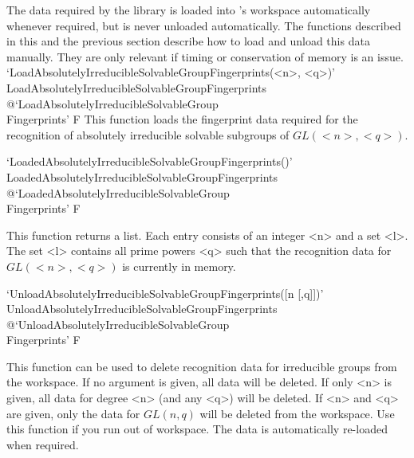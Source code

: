 
The data required by the {\IRREDSOL} library is loaded into {\GAP}'s workspace automatically whenever required, but is never unloaded automatically. The functions described in this
and the previous section describe how to load and unload this data manually. 
They are only relevant if timing or conservation of memory is an issue.
\>`LoadAbsolutelyIrreducibleSolvableGroupFingerprints(<n>, <q>)'%
{LoadAbsolutelyIrreducibleSolvableGroupFingerprints}%
@{`LoadAbsolutelyIrreducibleSolvableGroup\\Fingerprints'} F
This function loads the fingerprint data required for the recognition
of absolutely irreducible solvable subgroups of $GL(<n>, <q>)$.

\>`LoadedAbsolutelyIrreducibleSolvableGroupFingerprints()'%
{LoadedAbsolutelyIrreducibleSolvableGroupFingerprints}%
@{`LoadedAbsolutelyIrreducibleSolvableGroup\\Fingerprints'} F

This function returns a list. Each entry consists of an integer <n> and a set <l>. The set
<l> contains all prime powers <q> such that the recognition data for $GL(<n>, <q>)$ is currently in
memory.

\>`UnloadAbsolutelyIrreducibleSolvableGroupFingerprints([n [,q]])'%
{UnloadAbsolutelyIrreducibleSolvableGroupFingerprints}%
@{`UnloadAbsolutelyIrreducibleSolvableGroup\\Fingerprints'} F

This function can be used to delete recognition data for irreducible groups from the {\GAP} workspace. If no
argument is given, all data will be deleted. If only <n> is given, all data for degree <n> (and any
<q>) will be deleted. If <n> and <q> are given, only the data for $GL(n, q)$ will be deleted from the
{\GAP} workspace. Use this function if you run out of {\GAP} workspace. The
data is automatically re-loaded when required.


